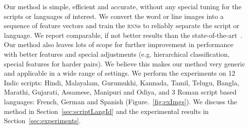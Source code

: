 Our method is simple, efficient and accurate, without any special tuning for the scripts or languages of interest. We convert the word or line images into a sequence of feature vectors and train the \textsc{rnn}s to reliably separate the script or language.  We report comparable, if not better results than the state-of-the-art~\cite{Pati}. Our method also leaves lots of scope for further improvement in performance with better features and special adjustments (e.g. hierarchical classification, special features for harder pairs). We believe this makes our method very generic and applicable in a wide range of settings. We perform the experiments on 12 Indic scripts: Hindi, Malayalam, Gurumukhi, Kannada, Tamil, Telugu, Bangla, Marathi, Gujarati, Assamese, Manipuri and Odiya, and 3 Roman script based languages: French, German and Spanish (Figure.~\ref{fig:exImgs}).  We discuss the method in Section~\ref{sec:scriptLangId} and the experimental results in Section~\ref{sec:experiments}.

